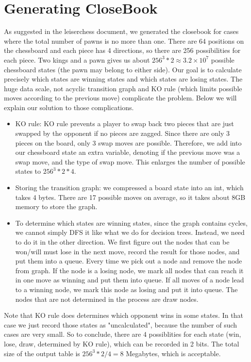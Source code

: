 \documentclass[10pt,twosidep]{article}
\begin{document}
\section{Generating CloseBook}
	As suggested in the leiserchess document, we generated the closebook 
	for cases where the total number of pawns is no more than one. 
	There are 64 positions on the chessboard and each piece has 4 directions, 
	so there are 256 possibilities for each piece. 
	Two kings and a pawn gives us about $256^3*2\approx 3.2\times 10^7$ possible chessboard states 
	(the pawn may belong to either side).
	Our goal is to calculate precisely which states are winning states and which states are losing states.
	The huge data scale, not acyclic transition graph and KO rule 
	(which limits possible moves according to the previous move) complicate the problem.
	Below we will explain our solution to those complications. 

	\begin{itemize}
	\item KO rule: KO rule prevents a player to swap back two pieces that are just swapped by the opponent 
	if no pieces are zagged. Since there are only 3 pieces on the board, only 3 swap moves are possible. 
	Therefore, we add into our chessboard state an extra variable, denoting if the previous move was a swap move, 
	and the type of swap move. This enlarges the number of possible states to $256^3*2*4$.
	\item Storing the transition graph: we compressed a board state into an int, which takes 4 bytes. 
	There are 17 possible moves on average, so it takes about 8GB memory to store the graph. 
	\item To determine which states are winning states, since the graph contains cycles, 
	we cannot simply DFS it like what we do for decision trees. Instead, 
	we need to do it in the other direction. 
	We first figure out the nodes that can be won/will must lose in the next move, 
	record the result for those nodes, and put them into a queue. 
	Every time we pick out a node and remove the node from graph. 
	If the node is a losing node, we mark all nodes that can reach it in one move as winning and put them into queue. 
	If all moves of a node lead to a winning node, we mark this node as losing and put it into queue. 
	The nodes that are not determined in the process are draw nodes. 
	\end{itemize}
	Note that KO rule does determines which opponent wins in some states. In that case 
	we just record those states as "uncalculated", because the number of such cases are very small.
	So to conclude, there are 4 possiblities for each state (win, lose, draw, determined by KO rule), 
	which can be recorded in 2 bits. The total size of the output table
	is $256^3*2/4=8$ Megabytes, which is acceptable.
\end{document}
